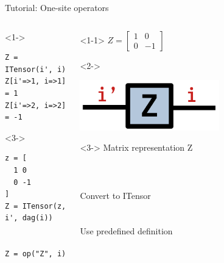\begin{frame}[fragile]{Tutorial: One-site operators}

\begin{columns}

\begin{column}{4.5cm}

\begin{onlyenv}<1->
\begin{lstlisting}[language=JuliaLocal, style=julia, basicstyle=\small]
Z = ITensor(i', i)
Z[i'=>1, i=>1] = 1
Z[i'=>2, i=>2] = -1
\end{lstlisting}
\end{onlyenv}

\begin{onlyenv}<3->
\begin{lstlisting}[language=JuliaLocal, style=julia, basicstyle=\small]
z = [
  1 0
  0 -1
]
Z = ITensor(z, i', dag(i))


Z = op("Z", i)
\end{lstlisting}
\end{onlyenv}

\end{column}

\begin{column}{4.5cm}

\begin{onlyenv}<1-1>
$Z = \begin{bmatrix} 1 & 0 \\ 0 & -1 \end{bmatrix}$
\end{onlyenv}

\begin{onlyenv}<2->
\begin{center}
\includegraphics[width=0.6\textwidth]{
  slides/assets/Z.png
}
\end{center}
\vspace*{0.5cm}
\end{onlyenv}

\begin{onlyenv}<3->
Matrix representation Z \\
~\\
~\\
~\\
Convert to ITensor \\
~\\
~\\
Use predefined definition
\end{onlyenv}

\end{column}

\end{columns}

\end{frame}
